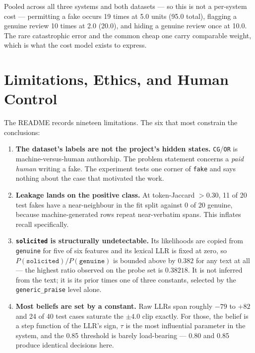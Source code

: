 \documentclass{article}
\begin{document}
Pooled across all three systems and both datasets --- so this is not a
per-system cost --- permitting a fake occurs 19 times at 5.0 units (95.0
total), flagging a genuine review 10 times at 2.0 (20.0), and hiding a genuine
review once at 10.0. The rare catastrophic error and the common cheap one carry
comparable weight, which is what the cost model exists to express.

\section{Limitations, Ethics, and Human Control}\label{sec:limits}

The README records nineteen limitations. The six that most constrain the
conclusions:

\begin{enumerate}
    \item \textbf{The dataset's labels are not the project's hidden states.}
          \texttt{CG}/\texttt{OR} is machine-versus-human authorship. The
          problem statement concerns a \emph{paid human} writing a fake. The
          experiment tests one corner of \texttt{fake} and says nothing about
          the case that motivated the work.
    \item \textbf{Leakage lands on the positive class.} At token-Jaccard
          $>0.30$, 11 of 20 test fakes have a near-neighbour in the fit split
          against 0 of 20 genuine, because machine-generated rows repeat
          near-verbatim spans. This inflates recall specifically.
    \item \textbf{\texttt{solicited} is structurally undetectable.} Its
          likelihoods are copied from \texttt{genuine} for five of six features
          and its lexical LLR is fixed at zero, so
          $P(\texttt{solicited})/P(\texttt{genuine})$ is bounded above by
          $0.382$ for any text at all --- the highest ratio observed on the
          probe set is $0.38218$. It is not inferred from the text; it is its
          prior times one of three constants, selected by the
          \texttt{generic\_praise} level alone.
    \item \textbf{Most beliefs are set by a constant.} Raw LLRs span roughly
          $-79$ to $+82$ and 24 of 40 test cases saturate the $\pm4.0$ clip
          exactly. For those, the belief is a step function of the LLR's sign,
          $\tau$ is the most influential parameter in the system, and the 0.85
          threshold is barely load-bearing --- 0.80 and 0.85 produce identical
          decisions here.

\end{enumerate}
\end{document}
